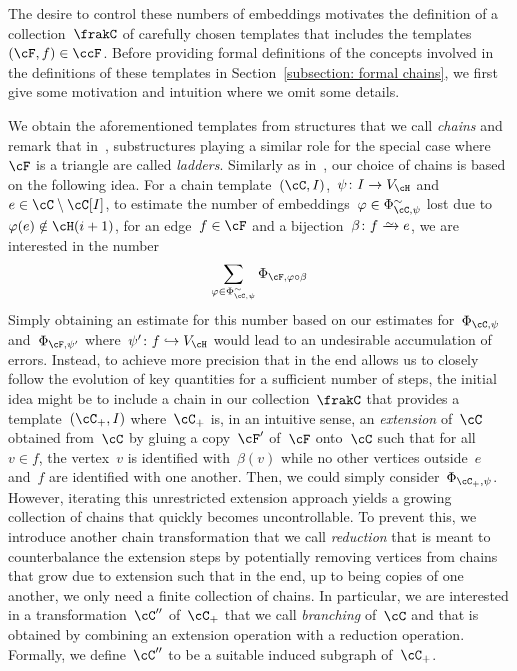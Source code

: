 \documentclass[11pt]{amsart}
\def\phi{\varphi}
\newcommand{\injection}{\hookrightarrow}
\newcommand{\bijection}{\mathchoice
	{\xrightarrow{\smash{\raisebox{-3pt}{$\scriptstyle\sim$}}}}%
	{\xrightarrow{\smash{\raisebox{-3pt}{$\scriptstyle\sim$}}}}%
	{\xrightarrow{\smash{\raisebox{-2.5pt}{$\scriptscriptstyle\sim$}}}}%
	{\xrightarrow{\smash{\raisebox{-2.5pt}{$\scriptscriptstyle\sim$}}}}%
}
\theoremstyle{definition}
\numberwithin{equation}{section}
\begin{document}
	The desire to control these numbers of embeddings motivates the definition of a collection~$\frakC$ of carefully chosen templates that includes the templates~$(\cF,f)\in\ccF$.
	Before providing formal definitions of the concepts involved in the definitions of these templates in Section~\ref{subsection: formal chains}, we first give some motivation and intuition where we omit some details.
	
	We obtain the aforementioned templates from structures that we call \emph{chains} and remark that in~\cite{BFL:15}, substructures playing a similar role for the special case where~$\cF$ is a triangle are called \emph{ladders}.
	Similarly as in~\cite{BFL:15}, our choice of chains is based on the following idea.
	For a chain template~$(\cC,I)$,~$\psi\colon I\rightarrow V_\cH$ and~$e\in\cC\setminus\cC[I]$, to estimate the number of embeddings~$\varphi\in \Phi^\sim_{\cC,\psi}$ lost due to~$\varphi(e)\notin\cH(i+1)$, for an edge~$f\in\cF$ and a bijection~$\beta\colon f\bijection e$, we are interested in the number
	\begin{equation}\label{equation: true loss at one edge motivation}
		\sum_{\phi\in\Phi_{\cC,\psi}^\sim}\Phi_{\cF,\phi\circ\beta}
	\end{equation}
	Simply obtaining an estimate for this number based on our estimates for~$\Phi_{\cC,\psi}$ and~$\Phi_{\cF,\psi'}$ where~$\psi'\colon f\injection V_\cH$ would lead to an undesirable accumulation of errors.
	Instead, to achieve more precision that in the end allows us to closely follow the evolution of key quantities for a sufficient number of steps, the initial idea might be to include a chain in our collection~$\frakC$ that provides a template~$(\cC_+,I)$ where~$\cC_+$ is, in an intuitive sense, an \emph{extension} of~$\cC$ obtained from~$\cC$ by gluing a copy~$\cF'$ of~$\cF$ onto~$\cC$ such that for all~$v\in f$, the vertex~$v$ is identified with~$\beta(v)$ while no other vertices outside~$e$ and~$f$ are identified with one another. 
	Then, we could simply consider~$\Phi_{\cC_+,\psi}$.
	However, iterating this unrestricted extension approach yields a growing collection of chains that quickly becomes uncontrollable.
	To prevent this, we introduce another chain transformation that we call \emph{reduction} that is meant to counterbalance the extension steps by potentially removing vertices from chains that grow due to extension such that in the end, up to being copies of one another, we only need a finite collection of chains.
	In particular, we are interested in a transformation~$\cC''$ of~$\cC_+$ that we call \emph{branching} of~$\cC$ and that is obtained by combining an extension operation with a reduction operation. Formally, we define~$\cC''$ to be a suitable induced subgraph of~$\cC_+$.
\end{document}

